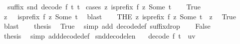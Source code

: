 \begin{isabellebody}
\ \ {\isachardoublequoteopen}suffix\ {\isacharparenleft}{\kern0pt}snd\ {\isacharparenleft}{\kern0pt}decode\ f\ t{\isacharparenright}{\kern0pt}{\isacharparenright}{\kern0pt}\ t{\isachardoublequoteclose}\isanewline
%
\isadelimproof
%
\endisadelimproof
%
\isatagproof
{}\isamarkupfalse%
\ {\isacharparenleft}{\kern0pt}cases\ {\isachardoublequoteopen}{\isasymexists}{\isacharbang}{\kern0pt}z{\isachardot}{\kern0pt}\ is{\isacharunderscore}{\kern0pt}prefix\ {\isacharparenleft}{\kern0pt}f\ z{\isacharparenright}{\kern0pt}\ {\isacharparenleft}{\kern0pt}Some\ t{\isacharparenright}{\kern0pt}{\isachardoublequoteclose}{\isacharparenright}{\kern0pt}\isanewline
\ \ \isamarkupfalse%
\ True\isanewline
\ \ \isamarkupfalse%
\ \isamarkupfalse%
\ z\ \ \ {\isachardoublequoteopen}is{\isacharunderscore}{\kern0pt}prefix\ {\isacharparenleft}{\kern0pt}f\ z{\isacharparenright}{\kern0pt}\ {\isacharparenleft}{\kern0pt}Some\ t{\isacharparenright}{\kern0pt}{\isachardoublequoteclose}\ \isamarkupfalse%
\ blast\isanewline
\ \ \isamarkupfalse%
\ {\isachardoublequoteopen}{\isacharparenleft}{\kern0pt}THE\ z{\isachardot}{\kern0pt}\ is{\isacharunderscore}{\kern0pt}prefix\ {\isacharparenleft}{\kern0pt}f\ z{\isacharparenright}{\kern0pt}\ {\isacharparenleft}{\kern0pt}Some\ t{\isacharparenright}{\kern0pt}{\isacharparenright}{\kern0pt}\ {\isacharequal}{\kern0pt}\ z{\isachardoublequoteclose}\ \isamarkupfalse%
\ True\ \isamarkupfalse%
\ blast\isanewline
\ \ \isamarkupfalse%
\ {\isacharquery}{\kern0pt}thesis\ \isamarkupfalse%
\ True\ \isamarkupfalse%
\ {\isacharparenleft}{\kern0pt}simp\ add{\isacharcolon}{\kern0pt}\ decode{\isacharunderscore}{\kern0pt}def\ suffix{\isacharunderscore}{\kern0pt}drop{\isacharparenright}{\kern0pt}\isanewline
{}\isamarkupfalse%
\isanewline
\ \ \isamarkupfalse%
\ False\isanewline
\ \ \isamarkupfalse%
\ \isamarkupfalse%
\ {\isacharquery}{\kern0pt}thesis\ \isamarkupfalse%
\ {\isacharparenleft}{\kern0pt}simp\ add{\isacharcolon}{\kern0pt}decode{\isacharunderscore}{\kern0pt}def{\isacharparenright}{\kern0pt}\isanewline
{}\isamarkupfalse%
%
\endisatagproof
{\isafoldproof}%
%
\isadelimproof
\isanewline
%
\endisadelimproof
\isanewline
{}\isamarkupfalse%
\ snd{\isacharunderscore}{\kern0pt}decode{\isacharunderscore}{\kern0pt}len{\isacharcolon}{\kern0pt}\isanewline
\ \ \ {\isachardoublequoteopen}decode\ f\ t\ {\isacharequal}{\kern0pt}\ {\isacharparenleft}{\kern0pt}u{\isacharcomma}{\kern0pt}v{\isacharparenright}{\kern0pt}{\isachardoublequoteclose}\isanewline

\end{isabellebody}
